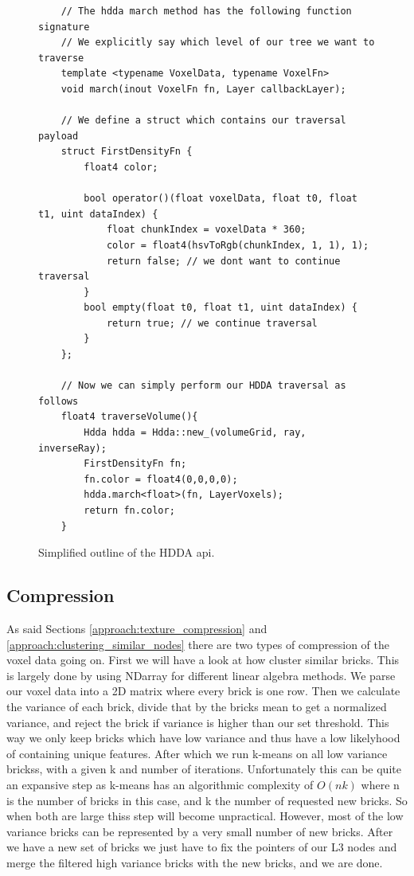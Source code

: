 \begin{figure}
    \begin{lstlisting}
    // The hdda march method has the following function signature
    // We explicitly say which level of our tree we want to traverse
    template <typename VoxelData, typename VoxelFn>
    void march(inout VoxelFn fn, Layer callbackLayer);

    // We define a struct which contains our traversal payload
    struct FirstDensityFn {
        float4 color;
    
        bool operator()(float voxelData, float t0, float t1, uint dataIndex) {
            float chunkIndex = voxelData * 360;
            color = float4(hsvToRgb(chunkIndex, 1, 1), 1);
            return false; // we dont want to continue traversal
        }
        bool empty(float t0, float t1, uint dataIndex) { 
            return true; // we continue traversal
        }
    };

    // Now we can simply perform our HDDA traversal as follows
    float4 traverseVolume(){
        Hdda hdda = Hdda::new_(volumeGrid, ray, inverseRay);
        FirstDensityFn fn;
        fn.color = float4(0,0,0,0);
        hdda.march<float>(fn, LayerVoxels); 
        return fn.color;
    }
\end{lstlisting}
    \caption{Simplified outline of the HDDA api.}\label{implementation:hdda_sample}
\end{figure}


\subsection{Compression} \label{implementation:compression}
As said Sections \ref{approach:texture_compression} and \ref{approach:clustering_similar_nodes} there are two types of compression of the voxel data going on. First we will have a look at how cluster similar bricks. This is largely done by using NDarray for different linear algebra methods. We parse our voxel data into a 2D matrix where every brick is one row. Then we calculate the variance of each brick, divide that by the bricks mean to get a normalized variance, and reject the brick if variance is higher than our set threshold. This way we only keep bricks which have low variance and thus have a low likelyhood of containing unique features. After which we run k-means on all low variance brickss, with a given k and number of iterations. Unfortunately this can be quite an expansive step as k-means has an algorithmic complexity of $O(nk)$ where n is the number of bricks in this case, and k the number of requested new bricks. So when both are large thiss step will become unpractical. However, most of the low variance bricks can be represented by a very small number of new bricks. After we have a new set of bricks we just have to fix the pointers of our L3 nodes and merge the filtered high variance bricks with the new bricks, and we are done.

